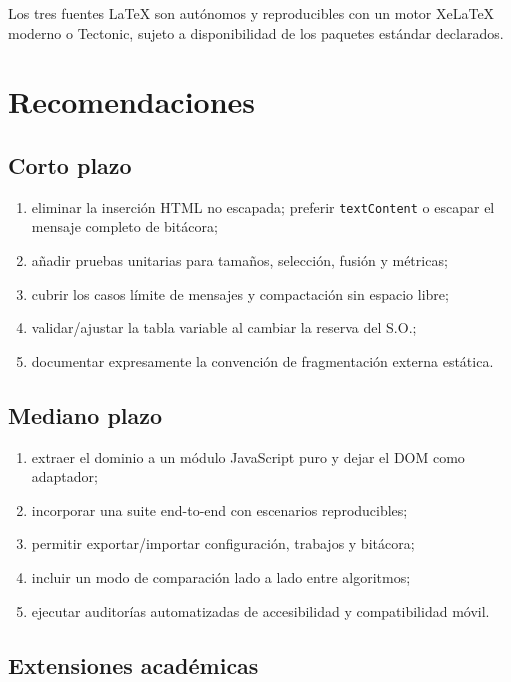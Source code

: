 \documentclass[11pt,a4paper]{article}
\begin{document}
Los tres fuentes LaTeX son autónomos y reproducibles con un motor XeLaTeX moderno
o Tectonic, sujeto a disponibilidad de los paquetes estándar declarados.

\section{Recomendaciones}

\subsection{Corto plazo}

\begin{enumerate}
  \item eliminar la inserción HTML no escapada; preferir \texttt{textContent} o
  escapar el mensaje completo de bitácora;
  \item añadir pruebas unitarias para tamaños, selección, fusión y métricas;
  \item cubrir los casos límite de mensajes y compactación sin espacio libre;
  \item validar/ajustar la tabla variable al cambiar la reserva del S.O.;
  \item documentar expresamente la convención de fragmentación externa estática.
\end{enumerate}

\subsection{Mediano plazo}

\begin{enumerate}
  \item extraer el dominio a un módulo JavaScript puro y dejar el DOM como adaptador;
  \item incorporar una suite end-to-end con escenarios reproducibles;
  \item permitir exportar/importar configuración, trabajos y bitácora;
  \item incluir un modo de comparación lado a lado entre algoritmos;
  \item ejecutar auditorías automatizadas de accesibilidad y compatibilidad móvil.
\end{enumerate}

\subsection{Extensiones académicas}
\end{document}
